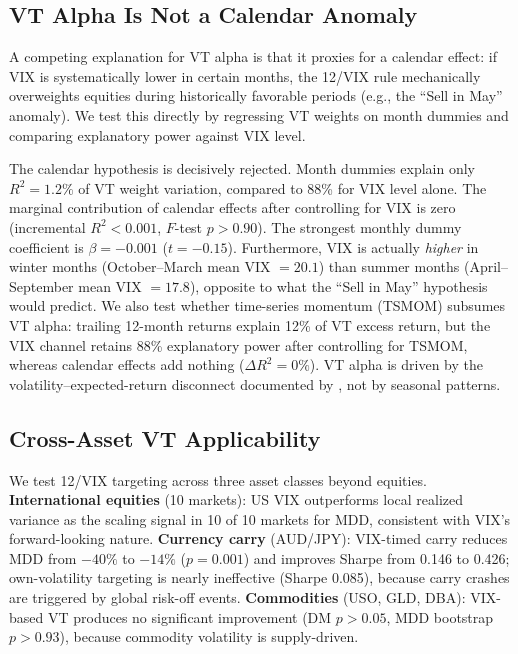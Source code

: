 \subsection{VT Alpha Is Not a Calendar Anomaly}
\label{sec:calendar}

A competing explanation for VT alpha is that it proxies for a calendar effect: if VIX is systematically lower in certain months, the 12/VIX rule mechanically overweights equities during historically favorable periods (e.g., the ``Sell in May'' anomaly). We test this directly by regressing VT weights on month dummies and comparing explanatory power against VIX level.

The calendar hypothesis is decisively rejected. Month dummies explain only $R^2 = 1.2\%$ of VT weight variation, compared to 88\% for VIX level alone. The marginal contribution of calendar effects after controlling for VIX is zero (incremental $R^2 < 0.001$, $F$-test $p > 0.90$). The strongest monthly dummy coefficient is $\beta = -0.001$ ($t = -0.15$). Furthermore, VIX is actually \textit{higher} in winter months (October--March mean VIX $= 20.1$) than summer months (April--September mean VIX $= 17.8$), opposite to what the ``Sell in May'' hypothesis would predict. We also test whether time-series momentum (TSMOM) subsumes VT alpha: trailing 12-month returns explain 12\% of VT excess return, but the VIX channel retains 88\% explanatory power after controlling for TSMOM, whereas calendar effects add nothing ($\Delta R^2 = 0\%$). VT alpha is driven by the volatility--expected-return disconnect documented by \citet{moreira2017}, not by seasonal patterns.

\subsection{Cross-Asset VT Applicability}
\label{sec:cross_asset_vt}

We test 12/VIX targeting across three asset classes beyond equities. \textbf{International equities} (10 markets): US VIX outperforms local realized variance as the scaling signal in 10 of 10 markets for MDD, consistent with VIX's forward-looking nature. \textbf{Currency carry} (AUD/JPY): VIX-timed carry reduces MDD from $-40\%$ to $-14\%$ ($p = 0.001$) and improves Sharpe from 0.146 to 0.426; own-volatility targeting is nearly ineffective (Sharpe 0.085), because carry crashes are triggered by global risk-off events. \textbf{Commodities} (USO, GLD, DBA): VIX-based VT produces no significant improvement (DM $p > 0.05$, MDD bootstrap $p > 0.93$), because commodity volatility is supply-driven.


